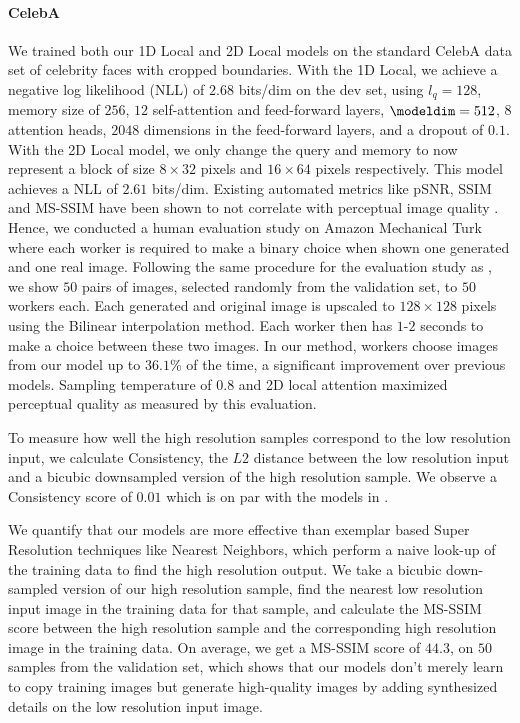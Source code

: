 



\paragraph{CelebA}

We trained both our 1D Local and 2D Local models on the standard CelebA data set of celebrity faces with cropped boundaries. With the 1D Local, we achieve a negative log likelihood (NLL) of $\mathbf{2.68}$ bits/dim on the dev set, using $l_q=128$, memory size of $256$, $12$ self-attention and feed-forward layers, $\modeldim=512$, $8$ attention heads, $2048$ dimensions in the feed-forward layers, and a dropout of $0.1$. With the 2D Local model, we only change the query and memory to now represent a block of size $8\times32$ pixels and $16\times64$ pixels respectively. This model achieves a NLL of $\mathbf{2.61}$ bits/dim.
Existing automated metrics like pSNR, SSIM and MS-SSIM have been shown to not correlate with perceptual image quality \citep{PixelRecursiveSuperResolution}. Hence, we conducted a human evaluation study on Amazon Mechanical Turk where each worker is required to make a binary choice when shown one generated and one real image. Following the same procedure for the evaluation study as \cite{PixelRecursiveSuperResolution}, we show $50$ pairs of images, selected randomly from the validation set, to $50$ workers each. Each generated and original image is upscaled to $128\times128$ pixels using the Bilinear interpolation method. Each worker then has $1$-$2$ seconds to make a choice between these two images. In our method, workers choose images from our model up to $36.1$\% of the time, a significant improvement over previous models. Sampling temperature of $0.8$ and 2D local attention maximized perceptual quality as measured by this evaluation.

To measure how well the high resolution samples correspond to the low resolution input, we calculate Consistency, the $L2$ distance between the low resolution input and a bicubic downsampled version of the high resolution sample. We observe a Consistency score of $0.01$ which is on par with the models in \cite{PixelRecursiveSuperResolution}. 

We quantify that our models are more effective than exemplar based Super Resolution techniques like Nearest Neighbors, which perform a naive look-up of the training data to find the high resolution output. We take a bicubic down-sampled version of our high resolution sample, find the nearest low resolution input image in the training data for that sample, and calculate the MS-SSIM score between the high resolution sample and the corresponding high resolution image in the training data. On average, we get a MS-SSIM score of $44.3$, on $50$ samples from the validation set, which shows that our models don't merely learn to copy training images but generate high-quality images by adding synthesized details on the low resolution input image.

